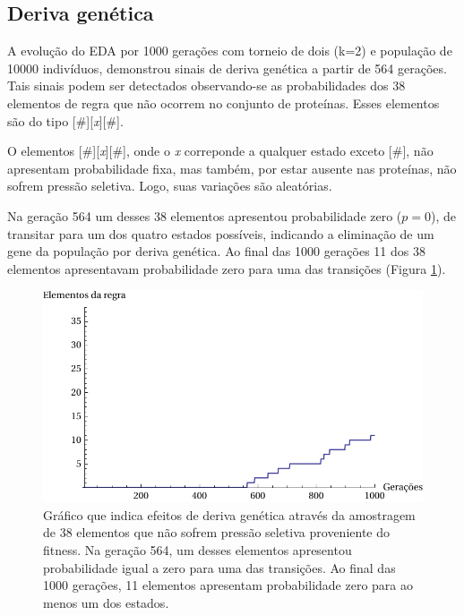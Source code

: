 \subsection{Deriva genética}

A evolução do EDA por 1000 gerações com torneio de dois (k=2) e população de 10000 indivíduos, demonstrou sinais de deriva genética a partir de 564 gerações. Tais sinais podem ser detectados observando-se as probabilidades dos 38 elementos de regra que não ocorrem no conjunto de proteínas. Esses elementos são do tipo [\#][\textit{x}][\#].

O elementos [\#][\textit{x}][\#], onde o \textit{x} correponde a qualquer estado exceto [\#], não apresentam probabilidade fixa, mas também, por estar ausente nas proteínas, não sofrem pressão seletiva. Logo, suas variações são aleatórias.

Na geração 564 um desses 38 elementos apresentou probabilidade zero ($p=0$), de transitar para um dos quatro estados possíveis, indicando a eliminação de um gene da população por deriva genética. Ao final das 1000 gerações 11 dos 38 elementos apresentavam probabilidade zero para uma das transições (Figura \ref{fig:deriva_genetica}).


\begin{figure}
  \centering
  \includegraphics[width=1\textwidth]{figures/deriva_genetica.pdf}
  \caption{Gráfico que indica efeitos de deriva genética através da amostragem de 38 elementos que não sofrem pressão seletiva proveniente do fitness. Na geração 564, um desses elementos apresentou probabilidade igual a zero para uma das transições. Ao final das 1000 gerações, 11 elementos apresentam probabilidade zero para ao menos um dos estados.}
        \label{fig:deriva_genetica}
\end{figure}

